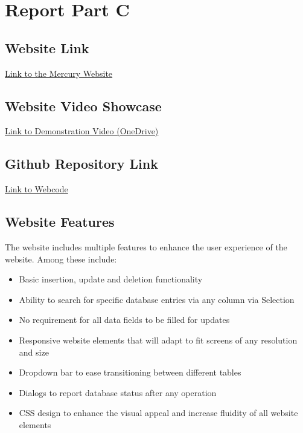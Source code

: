 \documentclass[openany]{article}
\begin{document}
\newpage
\section{Report Part C}

\subsection{Website Link}
	\begin{center}
		\href{http://hcytt1.mercury.nottingham.edu.my/address.php}{Link to the Mercury Website}
	\end{center}

\subsection{Website Video Showcase}
	\begin{center}
		\href{https://numcmy-my.sharepoint.com/:v:/g/personal/hcycl3_nottingham_edu_my/EXSHVn9W0NpKs46qVvkPRaYB7jFJyir5uJE3W_kIAa8p0g?e=dCDxFW}{Link to Demonstration Video (OneDrive)}
	\end{center}

\subsection{Github Repository Link}
	\begin{center}
		\href{https://github.com/HolyKritGrenade/comp1044dbi_cw2webcode}{Link to Webcode}
	\end{center}

\subsection{Website Features}
	The website includes multiple features to enhance the user experience of the website. Among these include:
	\begin{itemize}
		\item Basic insertion, update and deletion functionality
		\item Ability to search for specific database entries via any column via Selection
		\item No requirement for all data fields to be filled for updates
		\item Responsive website elements that will adapt to fit screens of any resolution and size
		\item Dropdown bar to ease transitioning between different tables
		\item Dialogs to report database status after any operation
		\item CSS design to enhance the visual appeal and increase fluidity of all website elements
	\end{itemize}
\end{document}
